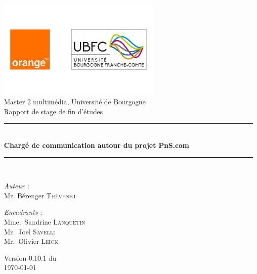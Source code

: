 \documentclass[a4paper,12pt]{book}
\theoremstyle{break}
\begin{document}

\begin{titlepage}
\begin{center}

\includegraphics[width=0.6\textwidth]{entete}\\[1cm]

{\large Master 2 multimédia, Université de Bourgogne}\\[0.5cm]

{\large Rapport de stage de fin d'études}\\[0.5cm]

\rule{\linewidth}{0.5mm} \\[0.4cm]
{ \huge \bfseries Chargé de communication autour du projet PnS.com \\[0.4cm] }
\rule{\linewidth}{0.5mm} \\[1.5cm]

\noindent
\begin{minipage}{0.4\textwidth}
  \begin{flushleft} \large
    \emph{Auteur :}\\
    Mr. Bérenger \textsc{Thévenet}\\
  \end{flushleft}
\end{minipage}%
\begin{minipage}{0.4\textwidth}
  \begin{flushright} \large
    \emph{Encadrants :} \\
    Mme.~Sandrine \textsc{Lanquetin}\\
    Mr.~Joel \textsc{Savelli}\\
    Mr.~Olivier \textsc{Leick}
  \end{flushright}
\end{minipage}

\vfill

{\large Version 0.10.1 du\\ \today}

\end{center}
\end{titlepage}
\end{document}
